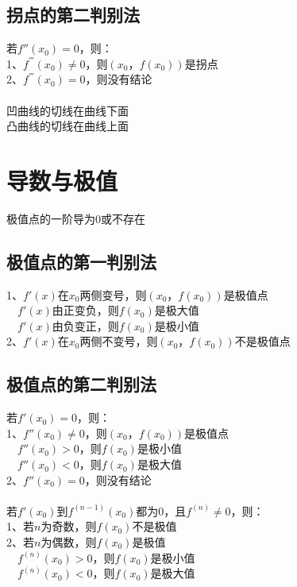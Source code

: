 \documentclass{article}
\begin{document}
\begin{flushleft}
	\subsection{拐点的第二判别法}
	若$f''(x_0)=0$，则：\\
	1、$f^{'''}(x_0)\neq 0$，则$(x_0，f(x_0))$是拐点\\
	2、$f^{'''}(x_0)=0$，则没有结论\\
	~\\
	凹曲线的切线在曲线下面\\
	凸曲线的切线在曲线上面\\
	
	\section{导数与极值}
	
	极值点的一阶导为0或不存在\\

	\subsection{极值点的第一判别法}
	1、$f'(x)$在$x_0$两侧变号，则$(x_0，f(x_0))$是极值点\\
	\ \ $f'(x)$由正变负，则$f(x_0)$是极大值\\
	\ \ $f'(x)$由负变正，则$f(x_0)$是极小值\\
	2、$f'(x)$在$x_0$两侧不变号，则$(x_0，f(x_0))$不是极值点\\

	\subsection{极值点的第二判别法}
	若$f'(x_0)=0$，则：\\
	1、$f''(x_0)\neq 0$，则$(x_0，f(x_0))$是极值点\\
	\ \ $f''(x_0)>0$，则$f(x_0)$是极小值\\
	\ \ $f''(x_0)<0$，则$f(x_0)$是极大值\\
	2、$f''(x_0)=0$，则没有结论\\
	~\\
	若$f'(x_0)$到$f^{(n-1)}(x_0)$都为0，且$f^{(n)}\neq 0$，则：\\
	1、若$n$为奇数，则$f(x_0)$不是极值\\
	2、若$n$为偶数，则$f(x_0)$是极值\\
	\ \ $f^{(n)}(x_0)>0$，则$f(x_0)$是极小值\\
	\ \ $f^{(n)}(x_0)<0$，则$f(x_0)$是极大值\\
	

\end{flushleft}
\end{document}

